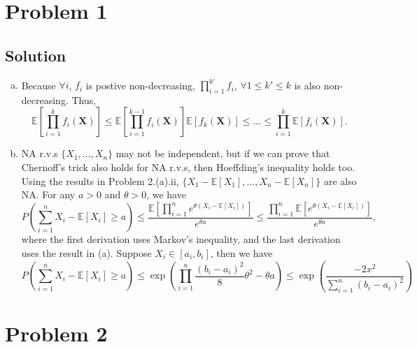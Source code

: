 \documentclass[11pt]{report}
\newcommand{\vect}[1]{\boldsymbol{\mathbf{#1}}}
\newcommand{\E}[1]{\mathbb{E}\left[#1\right]}
\begin{document}

\section*{Problem 1}
\subsection*{Solution}
\begin{enumerate}[(a)]
  \item Because $\forall i$, $f_i$ is postive non-decreasing, $\prod_{i=1}^{k'} f_i$, $\forall 1 \leq k' \leq k$ is also non-decreasing. Thus,
  \[
  \E{\prod_{i=1}^{k} f_i(\vect{X})} \leq \E{\prod_{i=1}^{k-1} f_i(\vect{X})} \E{f_k(\vect{X})} \leq \dots \leq \prod_{i=1}^{k}\E{f_i(\vect{X})}.
  \]
  \item NA r.v.s $\{X_1, \dots, X_n\}$ may not be independent, but if we can prove that Chernoff's trick also holds for NA r.v.s, then Hoeffding's inequality holds too. Using the results in Problem 2.(a).ii, $\{X_1 - \E{X_1}, \dots, X_n - \E{X_n}\}$ are also NA. For any $a > 0$ and $\theta > 0$, we have
  \[
    P(\sum_{i=1}^{n} X_i - \E{X_i} \geq a) \leq \frac{\E{\prod_{i=1}^{n} e^{\theta (X_i - \E{X_i})}}}{e^{\theta a}} \leq \frac{\prod_{i=1}^{n} \E{e^{\theta (X_i - \E{X_i})}}}{e^{\theta a}},
  \]
  where the first derivation uses Markov's inequality, and the last derivation uses the result in (a). Suppose $X_i \in [a_i, b_i]$, then we have
  \[
    P(\sum_{i=1}^{n} X_i - \E{X_i} \geq a) \leq \exp\left(\prod_{i=1}^{n} \frac{(b_i - a_i)^2}{8} \theta^2 - \theta a\right) \leq \exp\left(\frac{-2x^2}{\sum_{i=1}^{n} (b_i - a_i)^2}\right)
  \]
\end{enumerate}
\section*{Problem 2}
\end{document}
